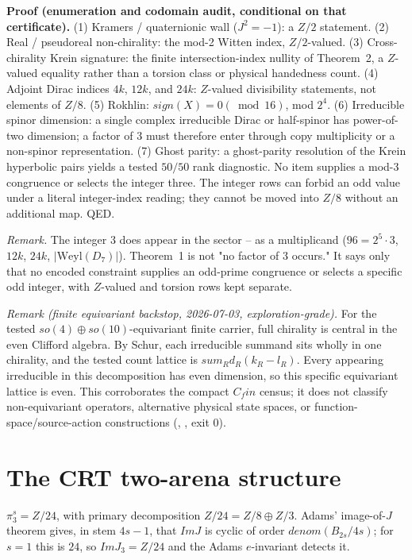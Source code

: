 \documentclass[11pt]{article}
\theoremstyle{remark}
\begin{document}
\textbf{Proof (enumeration and codomain audit, conditional on that certificate).} (1) Kramers / quaternionic wall ($J^2 = -1$): a $Z/2$ statement. (2) Real / pseudoreal non-chirality: the mod-2 Witten index, $Z/2$-valued. (3) Cross-chirality Krein signature: the finite intersection-index nullity of Theorem~2, a $Z$-valued equality rather than a torsion class or physical handedness count. (4) Adjoint Dirac indices $4k$, $12k$, and $24k$: $Z$-valued divisibility statements, not elements of $Z/8$. (5) Rokhlin: $sign(X) = 0 (\bmod 16)$, mod $2^4$. (6) Irreducible spinor dimension: a single complex irreducible Dirac or half-spinor has power-of-two dimension; a factor of 3 must therefore enter through copy multiplicity or a non-spinor representation. (7) Ghost parity: a ghost-parity resolution of the Krein hyperbolic pairs yields a tested $50/50$ rank diagnostic. No item supplies a mod-3 congruence or selects the integer three. The integer rows can forbid an odd value under a literal integer-index reading; they cannot be moved into $Z/8$ without an additional map. QED.

\emph{Remark.} The integer 3 does appear in the sector -- as a multiplicand ($96 = 2^5 \cdot 3$, $12k$, $24k$, $\lvert\mathrm{Weyl}(D_7)\rvert$). Theorem~1 is not "no factor of 3 occurs." It says only that no encoded constraint supplies an odd-prime congruence or selects a specific odd integer, with $Z$-valued and torsion rows kept separate.

\emph{Remark (finite equivariant backstop, 2026-07-03, exploration-grade).} For the tested $so(4) \oplus so(10)$-equivariant finite carrier, full chirality is central in the even Clifford algebra. By Schur, each irreducible summand sits wholly in one chirality, and the tested count lattice is ${ sum_R d_R (k_R - l_R) }$. Every appearing irreducible in this decomposition has even dimension, so this specific equivariant lattice is even. This corroborates the compact $C_fin$ census; it does not classify non-equivariant operators, alternative physical state spaces, or function-space/source-action constructions (, , exit 0).

\section{The CRT two-arena structure}
$\pi_3^s = Z/24$, with primary decomposition $Z/24 = Z/8 \oplus Z/3$. Adams' image-of-$J$ theorem gives, in stem $4s-1$, that $Im J$ is cyclic of order $denom(B_{2s}/4s)$; for $s=1$ this is $24$, so $Im J_3 = Z/24$ and the Adams $e$-invariant detects it.
\end{document}
